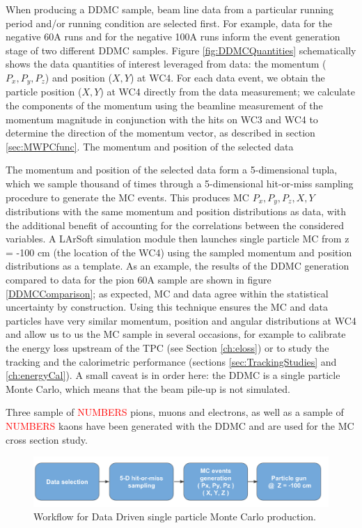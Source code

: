 When producing a DDMC sample, beam line data from a particular running period and/or running condition are selected first. For example, data for the negative 60A runs and for the negative 100A runs inform the event generation stage of two different DDMC samples. Figure \ref{fig:DDMCQuantities}  schematically shows the data quantities of interest leveraged from data: the momentum ($P_x, P_y, P_z$) and position ($X, Y$) at WC4. For each data event, we obtain the  particle position ($X, Y$) at WC4 directly from the data measurement; we calculate the components of the momentum using the beamline measurement of the momentum magnitude in conjunction with the hits on WC3 and WC4 to determine the direction of the momentum vector, as described in section \ref{sec:MWPCfunc}. The momentum and position of the selected data 

The momentum and position of the selected data form a 5-dimensional tupla, which we sample thousand of times through a 5-dimensional hit-or-miss sampling procedure to generate the MC events. This produces MC $P_x, P_y, P_z, X, Y$ distributions  with the same momentum and position distributions as data, with the additional benefit of accounting for the correlations between the considered variables. A LArSoft simulation module then launches single particle MC from z = -100 cm (the location of the WC4) using the sampled momentum and position distributions as a template. 
As an example, the results of the DDMC generation compared to data for the pion 60A sample are shown in figure \ref{DDMCComparison}; as expected, MC and data agree within the statistical uncertainty by construction. Using this technique ensures the MC and data particles have very similar momentum, position and angular distributions at WC4 and allow us to us the MC sample in several occasions, for example to calibrate the energy loss upstream of the TPC (see Section \ref{ch:eloss}) or to study the tracking and the calorimetric performance (sections \ref{sec:TrackingStudies} and \ref{ch:energyCal}). A small caveat is in order here: the DDMC is a single particle Monte Carlo, which means that the beam pile-up is not simulated. 


Three sample of \textcolor{red}{NUMBERS} pions, muons and electrons, as well as  a sample of \textcolor{red}{NUMBERS} kaons have been generated with the DDMC and are used for the MC cross section study.

\begin{figure}[hpbt]
\centering
\includegraphics[width=\textwidth]{Chapter-5/Images/DDMCScheme.png}
\caption{Workflow for Data Driven single particle Monte Carlo production.}
\label{fig:DDMCSketch}
\end{figure}



